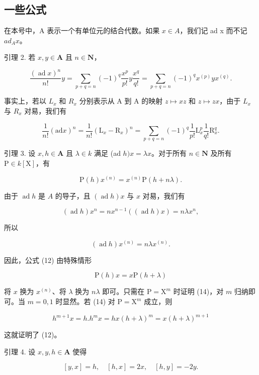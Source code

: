 \subsection{一些公式}

在本号中，A 表示一个有单位元的结合代数。如果 \(x \in A\)，我们记 ad x 而不记 \(ad_{A}x\)。

引理 2. 若 \(x, y \in \mathbf{A}\) 且 \(n \in \mathbf{N}\)，

\[
\frac {(\operatorname{ad} x) ^ {n}}{n !} y = \sum_ {p + q = n} (- 1) ^ {q} \frac {x ^ {p}}{p !} y \frac {x ^ {q}}{q !} = \sum_ {p + q = n} (- 1) ^ {q} x ^ {(p)} y x ^ {(q)}.\tag{11}
\]

事实上，若以 \(L_{x}\) 和 \(R_{x}\) 分别表示从 A 到 A 的映射 \(z \mapsto xz\) 和 \(z \mapsto zx\)，由于 \(L_{x}\) 与 \(R_{x}\) 对易，我们有

\[
\frac {1}{n !} (\mathrm{ad} x) ^ {n} = \frac {1}{n !} (\mathrm{L} _ {x} - \mathrm{R} _ {x}) ^ {n} = \sum_ {p + q = n} (- 1) ^ {q} \frac {1}{p !} \mathrm{L} _ {x} ^ {p} \frac {1}{q !} \mathrm{R} _ {x} ^ {q}.
\]

引理 3. 设 \(x, h \in \mathbf{A}\) 且 \(\lambda \in k\) 满足 (ad \(h)x = \lambda x\)。对于所有 \(n \in \mathbf{N}\) 及所有 \(\mathrm{P} \in k[\mathrm{X}]\)，有

\[
\mathrm{P} (h) x ^ {(n)} = x ^ {(n)} \mathrm{P} (h + n \lambda).\tag{12}
\]

由于 \(\operatorname{ad} h\) 是 \(A\) 的导子，且 \((\operatorname{ad} h)x\) 与 \(x\) 对易，我们有

\[
(\operatorname{ad} h) x ^ {n} = n x ^ {n - 1} ((\operatorname{ad} h) x) = n \lambda x ^ {n},\tag{13}
\]

所以

\[
(\operatorname{ad} h) x ^ {(n)} = n \lambda x ^ {(n)}.
\]

因此，公式 (12) 由特殊情形

\[
\mathrm{P} (h) x = x \mathrm{P} (h + \lambda)\tag{14}
\]

将 \(x\) 换为 \(x^{(n)}\)、将 \(\lambda\) 换为 \(n\lambda\) 即可。只需在 \(\mathrm{P} = \mathrm{X}^m\) 时证明 (14)，对 \(m\) 归纳即可。当 \(m = 0, 1\) 时显然。若 (14) 对 \(\mathrm{P} = \mathrm{X}^m\) 成立，则

\[
h ^ {m + 1} x = h. h ^ {m} x = h x (h + \lambda) ^ {m} = x (h + \lambda) ^ {m + 1}
\]

这就证明了 (12)。

引理 4. 设 \(x, y, h \in \mathbf{A}\) 使得

\[
[ y, x ] = h, \quad [ h, x ] = 2 x, \quad [ h, y ] = - 2 y.\tag{15}
\]

